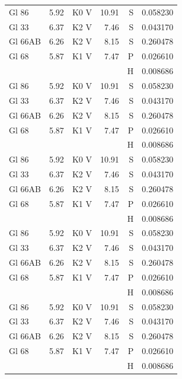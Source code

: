 \documentclass{aa}
\begin{document}
{\begin{landscape}
\begin{longtable}{lllrrr}
			Gl 86     & 5.92    & K0 V     & 10.91    & S    & 0.058230    \\   Gl 33    & 6.37 & K2 V & 7.46 & S & 0.043170\\
			Gl 66AB   & 6.26    & K2 V     & 8.15     & S    & 0.260478    \\
			Gl 68     & 5.87    & K1 V     & 7.47     & P    & 0.026610    \\
			          &         &          &          & H    & 0.008686    \\
			Gl 86     & 5.92    & K0 V     & 10.91    & S    & 0.058230    \\   Gl 33    & 6.37 & K2 V & 7.46 & S & 0.043170\\
			Gl 66AB   & 6.26    & K2 V     & 8.15     & S    & 0.260478    \\
			Gl 68     & 5.87    & K1 V     & 7.47     & P    & 0.026610    \\
			          &         &          &          & H    & 0.008686    \\
			Gl 86     & 5.92    & K0 V     & 10.91    & S    & 0.058230    \\   Gl 33    & 6.37 & K2 V & 7.46 & S & 0.043170\\
			Gl 66AB   & 6.26    & K2 V     & 8.15     & S    & 0.260478    \\
			Gl 68     & 5.87    & K1 V     & 7.47     & P    & 0.026610    \\
			          &         &          &          & H    & 0.008686    \\
			Gl 86     & 5.92    & K0 V     & 10.91    & S    & 0.058230    \\   Gl 33    & 6.37 & K2 V & 7.46 & S & 0.043170\\
			Gl 66AB   & 6.26    & K2 V     & 8.15     & S    & 0.260478    \\
			Gl 68     & 5.87    & K1 V     & 7.47     & P    & 0.026610    \\
			          &         &          &          & H    & 0.008686    \\
			Gl 86     & 5.92    & K0 V     & 10.91    & S    & 0.058230    \\   Gl 33    & 6.37 & K2 V & 7.46 & S & 0.043170\\
			Gl 66AB   & 6.26    & K2 V     & 8.15     & S    & 0.260478    \\
			Gl 68     & 5.87    & K1 V     & 7.47     & P    & 0.026610    \\
			          &         &          &          & H    & 0.008686    \\

\end{longtable}
\end{landscape}}
\end{document}
